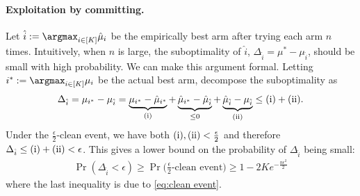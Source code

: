 \paragraph{Exploitation by committing.}
Let $\hat{i}:=\argmax_{i\in[K]} \hat{\mu}_{i}$ be the empirically best arm after trying each arm $n$ times.
Intuitively, when $n$ is large, the suboptimality of $\hat{i}$, $\Delta_{\hat{i}}=\mu^* - \mu_{\hat{i}}$, should be small with high probability.
We can make this argument formal.
Letting $i^*:=\argmax_{i\in[K]} {\mu}_{i}$ be the actual best arm, decompose the suboptimality as 
\begin{align*}
    \Delta_{\hat{i}} = 
\mu_{i^*}-\mu_{\hat{i}} =\underbrace{\mu_{i^*}-\hat{\mu}_{i^*}}_{{\rm (i)}}+\underbrace{\hat{\mu}_{i^*}-\hat{\mu}_{\hat{i}}}_{\leq 0}+\underbrace{\hat{\mu}_{\hat{i}}-\mu_{\hat{i}}}_{\rm (ii)}
\leq {\rm (i)}+{\rm (ii)}
.
\end{align*}
Under the $\frac{\epsilon}{2}$-clean event, we have both ${\rm (i)},{\rm (ii)}<\frac{\epsilon}{2}$ and therefore $\Delta_{\hat{i}}\leq{\rm (i)}+{\rm (ii)}<\epsilon$.
This gives a lower bound on the probability of $\Delta_{\hat{i}}$ being small:
\begin{align}
\label{eq:Delta_hat_i}
    \Pr(\Delta_{\hat{i}}<\epsilon) \geq \Pr\big(\text{$\tfrac{\epsilon}{2}$-clean event}\big) \geq 1 - 2K e^{-\frac{n \epsilon^2}{2}}
\end{align}
where the last inequality is due to \eqref{eq:clean event}.


